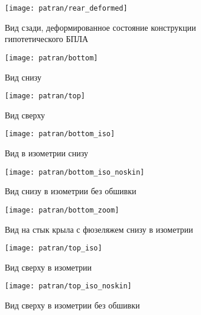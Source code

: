 \begin{figure}[H]
\centering
\texttt{[image: patran/rear\_deformed]}
\caption{Вид сзади, деформированное состояние конструкции гипотетического БПЛА}
\label{fig:patranRearDeformed}
\end{figure}


\begin{figure}[H]
\centering
\texttt{[image: patran/bottom]}
\caption{Вид снизу}
\label{fig:patranBottom}
\end{figure}


\begin{figure}[H]
\centering
\texttt{[image: patran/top]}
\caption{Вид сверху}
\label{fig:patranTop}
\end{figure}


\begin{figure}[H]
\centering
\texttt{[image: patran/bottom\_iso]}
\caption{Вид в изометрии снизу}
\label{fig:patranBottomIso}
\end{figure}

\begin{figure}[H]
\centering
\texttt{[image: patran/bottom\_iso\_noskin]}
\caption{Вид снизу в изометрии без обшивки}
\label{fig:patranBottomIsoWithoutSkin}
\end{figure}

\begin{figure}[H]
\centering
\texttt{[image: patran/bottom\_zoom]}
\caption{Вид на стык крыла с фюзеляжем снизу в изометрии}
\label{fig:patranBottomIsoZoom}
\end{figure}


\begin{figure}[H]
\centering
\texttt{[image: patran/top\_iso]}
\caption{Вид сверху в изометрии}
\label{fig:patranTopIso}
\end{figure}

\begin{figure}[H]
\centering
\texttt{[image: patran/top\_iso\_noskin]}
\caption{Вид сверху в изометрии без обшивки}
\label{fig:patranTopIsoWithoutSk}
\end{figure}

%
